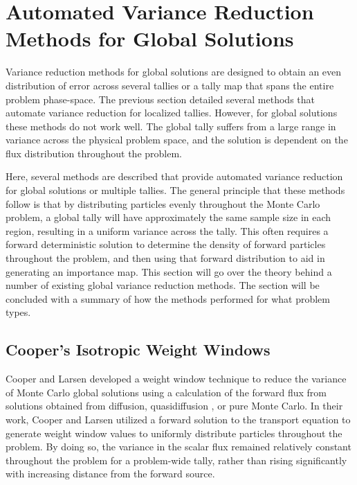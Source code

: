 \section{Automated Variance Reduction Methods for Global Solutions}
\label{sec:GlobalVR}

Variance reduction methods for global solutions are designed to obtain an even
distribution of error across several tallies or a tally map that spans the
entire problem phase-space.
The previous section detailed several methods that automate variance reduction
for localized tallies. However, for global solutions these methods do not work
well. The global tally suffers from a large range in variance across the
physical problem space, and the solution is dependent on the flux distribution
throughout the problem. 

Here, several methods are described that provide
automated variance reduction for global solutions or multiple tallies. The
general principle that these methods follow is that by distributing particles
evenly throughout the Monte Carlo problem, a global tally will have
approximately the same sample size in each region, resulting in a uniform
variance across the tally. This often requires a forward deterministic solution
to determine the density of forward particles throughout the problem, and then
using that forward distribution to aid in generating an importance map. This
section will go over the theory behind a number of existing global variance
reduction methods. The section will be concluded with a summary of how the methods
performed for what problem types.

\subsection{Cooper's Isotropic Weight Windows}
\label{subsec:CooperGlobal}

Cooper and Larsen developed a weight window technique to reduce the variance of
Monte Carlo global solutions \cite{cooper_automated_2001} using a calculation of
the forward flux from solutions obtained from diffusion, quasidiffusion
\cite{miften_quasi-diffusion_1993}, or pure
Monte Carlo. In their work, Cooper
and Larsen utilized a forward solution to the transport equation to generate
weight window values to uniformly distribute particles throughout the problem.
By doing so, the variance in the
scalar flux remained relatively constant throughout the problem for a
problem-wide tally, rather than
rising significantly with increasing distance from the forward source. 

